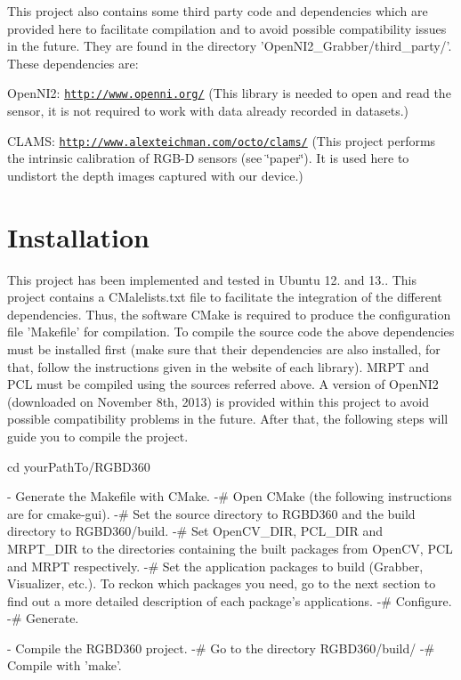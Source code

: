 This project also contains some third party code and dependencies which are provided here to facilitate compilation and to avoid possible compatibility issues in the future. They are found in the directory 'Open\-N\-I2\-\_\-\-Grabber/third\-\_\-party/'. These dependencies are\-:
\begin{DoxyItemize}
\item Open\-N\-I2\-: \href{http://www.openni.org/}{\tt http\-://www.\-openni.\-org/} (This library is needed to open and read the sensor, it is not required to work with data already recorded in datasets.)
\item C\-L\-A\-M\-S\-: \href{http://www.alexteichman.com/octo/clams/}{\tt http\-://www.\-alexteichman.\-com/octo/clams/} (This project performs the intrinsic calibration of R\-G\-B-\/\-D sensors (see \char`\"{}paper\char`\"{}). It is used here to undistort the depth images captured with our device.)
\end{DoxyItemize}\hypertarget{index_install_sec}{}\section{Installation}\label{index_install_sec}
This project has been implemented and tested in Ubuntu 12. and 13.. This project contains a C\-Malelists.\-txt file to facilitate the integration of the different dependencies. Thus, the software C\-Make is required to produce the configuration file 'Makefile' for compilation. To compile the source code the above dependencies must be installed first (make sure that their dependencies are also installed, for that, follow the instructions given in the website of each library). M\-R\-P\-T and P\-C\-L must be compiled using the sources referred above. A version of Open\-N\-I2 (downloaded on November 8th, 2013) is provided within this project to avoid possible compatibility problems in the future. After that, the following steps will guide you to compile the project. \begin{DoxyVerb}cd yourPathTo/RGBD360
\end{DoxyVerb}
 \begin{DoxyVerb}  - Generate the Makefile with CMake.
       -# Open CMake (the following instructions are for cmake-gui).
       -# Set the source directory to RGBD360 and the build directory to RGBD360/build.
       -# Set OpenCV_DIR, PCL_DIR and MRPT_DIR to the directories containing the built packages from OpenCV, PCL and MRPT respectively.
       -# Set the application packages to build (Grabber, Visualizer, etc.). To reckon which packages you need, go to the next section to find out a more detailed description of each package's applications.
       -# Configure.
       -# Generate.

  - Compile the RGBD360 project.
       -# Go to the directory RGBD360/build/
       -# Compile with 'make'.
\end{DoxyVerb}


